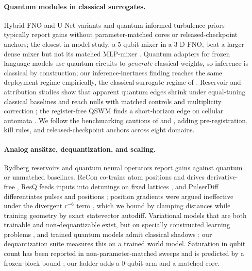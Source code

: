 \documentclass{article}
\begin{document}
\paragraph{Quantum modules in classical surrogates.} Hybrid FNO and U-Net variants
\citep{ma2025qufex,liu2026hqfnet,ali2026phqfno} and quantum-informed turbulence priors \citep{wang2026qiml,xue2026qcml}
typically report gains without parameter-matched cores or released-checkpoint anchors; the closest in-model study, a 5-qubit
mixer in a 3-D FNO, beat a larger dense mixer but not its matched MLP-mixer \citep{papierz2026hqlpfno}. Quantum
adapters for frozen language models \citep{koikeakino2025quantumpeft,liu2025qpa} use quantum circuits to
\emph{generate} classical weights, so inference is classical by construction; our inference-inertness finding
reaches the same deployment regime empirically, the classical-surrogate regime of \citet{schreiber2023surrogates}. Reservoir and attribution studies show that apparent quantum edges
shrink under equal-tuning classical baselines \citep{pandey2026qrcbaselines,pandey2026qrcdimension} and reach nulls
with matched controls and multiplicity correction \citep{chen2026qeat,gillani2026audit,levy2026sidecar,herbort2026cloud};
the register-free QSWM finds a short-horizon edge on cellular automata \citep{sun2026qswm}. We follow the benchmarking
cautions of \citet{bowles2024better} and \citet{schuld2022advantage}, adding pre-registration, kill rules, and
released-checkpoint anchors across eight domains.

\paragraph{Analog ansätze, dequantization, and scaling.} Rydberg reservoirs \citep{bravo2022rydbergqrc,kornjaca2024aquila}
and quantum neural operators \citep{wang2025quanonet} report gains against quantum or unmatched baselines. ReCon co-trains atom positions and drives derivative-free
\citep{silver2024recon}, ResQ feeds inputs into detunings on fixed lattices \citep{chen2026resq}, and PulserDiff
differentiates pulses and positions \citep{pulserdiff2025}; position gradients were argued ineffective under the divergent $r^{-6}$
term \citep{dekeijzer2025consensus}, which we bound by clamping distances while training geometry by exact statevector
autodiff. Variational models that are both trainable and non-dequantizable exist, but on specially constructed learning
problems \citep{gilfuster2025dequant}, and trained quantum models admit classical shadows
\citep{keller2026shadow}; our dequantization suite measures this on a trained world model. Saturation in qubit count
has been reported in non-parameter-matched sweeps \citep{ionq2026scaling,vyskubov2026scaling,zabihi2026hqpinn} and is
predicted by a frozen-block bound \citep{qi2026lego}; our ladder adds a 0-qubit arm and a matched core.
\end{document}
